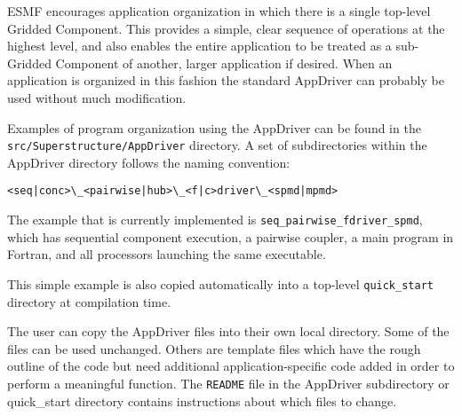 %


ESMF encourages application organization in which there is a single 
top-level Gridded Component.  This provides a simple, clear sequence
of operations at the highest level, and also enables the entire 
application to be treated as a sub-Gridded Component of another, larger 
application if desired.  When an application is organized in this fashion 
the standard AppDriver can probably be used without much modification.  

Examples of program organization using the AppDriver can be found in the 
{\tt src/Superstructure/AppDriver} directory.  A set of subdirectories 
within the AppDriver directory follows the naming convention:
\begin{verbatim}
<seq|conc>\_<pairwise|hub>\_<f|c>driver\_<spmd|mpmd>
\end{verbatim}

The example that is currently implemented is 
{\tt seq\_pairwise\_fdriver\_spmd}, which
has sequential component execution, a pairwise coupler, a main program
in Fortran, and all processors launching the same executable.

This simple example is also copied automatically into a top-level 
{\tt quick\_start} directory at compilation time.  

The user can copy the AppDriver files into
their own local directory. Some of the files can be used unchanged.
Others are template files which have the rough outline of the code but
need additional application-specific code added in order to perform a
meaningful function.  The {\tt README} file in the AppDriver 
subdirectory or quick\_start directory contains instructions about 
which files to change.
